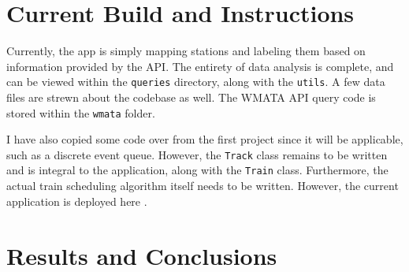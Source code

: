 \documentclass[a4paper,12pt]{article}
\begin{document}
\section{Current Build and Instructions}
Currently, the app is simply mapping stations and labeling them based on information provided by the API. The entirety
of data analysis is complete, and can be
viewed within the \texttt{queries} directory, along with the \texttt{utils}. A few data files are strewn about the
codebase as well. The WMATA API query code is stored within the \texttt{wmata} folder.

I have also copied some code over from the first project since it will be applicable, such as a discrete event queue.
However, the \texttt{Track} class remains to be written and is integral to the application, along with the \texttt{Train}
class. Furthermore, the actual
train scheduling algorithm itself needs to be written. However, the current application is deployed here
\cite{aprilandchip}.

\section{Results and Conclusions}



\end{document}
